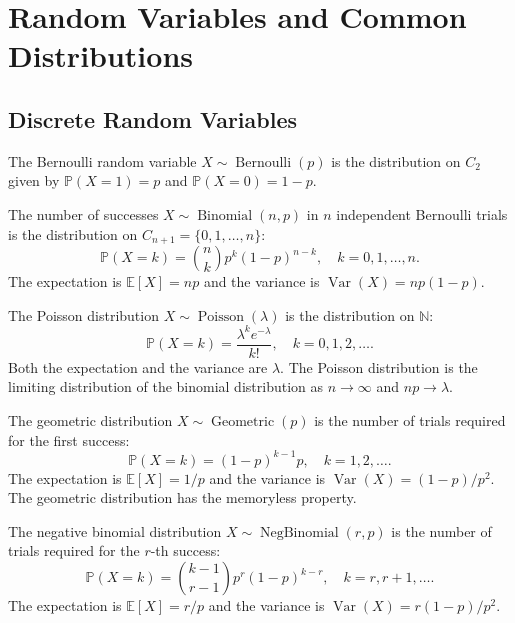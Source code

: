 \section{Random Variables and Common Distributions}\label{sec:common_distributions}

\subsection{Discrete Random Variables}

\begin{definition}\label{def:bernoulli_binomial}
The Bernoulli random variable $X \sim \operatorname{Bernoulli}(p)$ is the distribution on $C_2$ given by $\mathbb{P}(X=1) = p$ and $\mathbb{P}(X=0) = 1-p$.

The number of successes $X \sim \operatorname{Binomial}(n, p)$ in $n$ independent Bernoulli trials is the distribution on $C_{n+1} = \{0, 1, \dots, n\}$:
\[
\mathbb{P}(X = k) = \binom{n}{k} p^k (1-p)^{n-k}, \quad k = 0, 1, \dots, n.
\]
The expectation is $\mathbb{E}[X] = np$ and the variance is $\operatorname{Var}(X) = np(1-p)$.
\end{definition}

\begin{definition}\label{def:poisson_distribution}
The Poisson distribution $X \sim \operatorname{Poisson}(\lambda)$ is the distribution on $\mathbb{N}$:
\[
\mathbb{P}(X = k) = \frac{\lambda^k e^{-\lambda}}{k!}, \quad k = 0, 1, 2, \dots.
\]
Both the expectation and the variance are $\lambda$. The Poisson distribution is the limiting distribution of the binomial distribution as $n \to \infty$ and $np \to \lambda$.
\end{definition}

\begin{definition}\label{def:geometric_negbinomial}
The geometric distribution $X \sim \operatorname{Geometric}(p)$ is the number of trials required for the first success:
\[
\mathbb{P}(X = k) = (1-p)^{k-1} p, \quad k = 1, 2, \dots.
\]
The expectation is $\mathbb{E}[X] = 1/p$ and the variance is $\operatorname{Var}(X) = (1-p)/p^2$. The geometric distribution has the memoryless property.

The negative binomial distribution $X \sim \operatorname{NegBinomial}(r, p)$ is the number of trials required for the $r$-th success:
\[
\mathbb{P}(X = k) = \binom{k-1}{r-1} p^r (1-p)^{k-r}, \quad k = r, r+1, \dots.
\]
The expectation is $\mathbb{E}[X] = r/p$ and the variance is $\operatorname{Var}(X) = r(1-p)/p^2$.
\end{definition}


